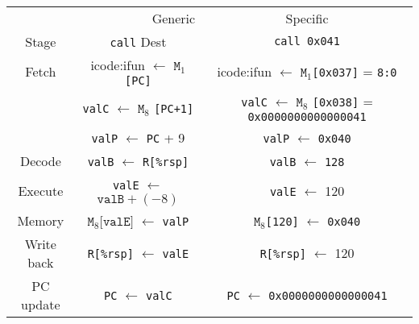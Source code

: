 \documentclass[12pt]{article}
\newenvironment{sol}[1][Solution]{\begin{trivlist}
		\item[\hskip \labelsep {\bfseries #1:}]}{\end{trivlist}}
\begin{document}
\begin{sol}
	\
	\begin{center}
		\begin{tabular}{ccc}
			\multicolumn{2}{r}{Generic} & Specific\\
			Stage & \texttt{call} Dest & \texttt{call 0x041}\\
			\hline
			Fetch & icode:ifun $\leftarrow$ $\texttt{M}_1$\texttt{[PC]}&
			 icode:ifun $\leftarrow$ $\texttt{M}_1$\texttt{[\texttt{0x037}]} = \texttt{8:0}\\
			
			{}&\texttt{valC} $\leftarrow$ $\texttt{M}_8$ \texttt{[PC+1]} & \texttt{valC} $\leftarrow$ $\texttt{M}_8$ \texttt{[0x038]} = 
			\texttt{0x0000000000000041}
			\\
			
			{} & \texttt{valP} $\leftarrow$ \texttt{PC} + 9 &
			\texttt{valP} $\leftarrow$ \texttt{0x040}\\
			
			Decode & \texttt{valB} $\leftarrow$ \texttt{R[\%rsp]} &
			\texttt{valB} $\leftarrow$ \texttt{128}\\
			 
			Execute & \texttt{valE} $\leftarrow$ $\texttt{valB} + (-8)$ &
			\texttt{valE} $\leftarrow$ 120\\
			
			Memory & $\texttt{M}_8\texttt{[valE]}$ $\leftarrow$ \texttt{valP} &
			$\texttt{M}_8$\texttt{[120]} $\leftarrow$ \texttt{0x040}\\
			
			Write back & \texttt{R[\%rsp]} $\leftarrow$ \texttt{valE} &
			\texttt{R[\%rsp]} $\leftarrow$ 120\\
			
			PC update& \texttt{PC} $\leftarrow$ \texttt{valC} &
			\texttt{PC} $\leftarrow$ \texttt{0x0000000000000041}
		\end{tabular}
	\end{center}
\end{sol}
\end{document}
